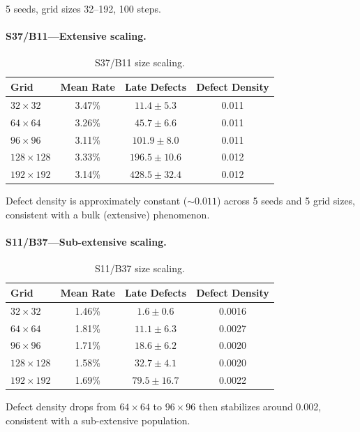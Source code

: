 \documentclass[11pt]{article}
\theoremstyle{definition}
\theoremstyle{remark}
\begin{document}
5 seeds, grid sizes 32--192, 100 steps.

\paragraph{S37/B11---Extensive scaling.}

\begin{table}[h]
\centering
\caption{S37/B11 size scaling.}
\begin{tabular}{lccc}
\toprule
Grid & Mean Rate & Late Defects & Defect Density \\
\midrule
$32 \times 32$   & 3.47\% & $11.4 \pm 5.3$  & 0.011 \\
$64 \times 64$   & 3.26\% & $45.7 \pm 6.6$  & 0.011 \\
$96 \times 96$   & 3.11\% & $101.9 \pm 8.0$ & 0.011 \\
$128 \times 128$ & 3.33\% & $196.5 \pm 10.6$ & 0.012 \\
$192 \times 192$ & 3.14\% & $428.5 \pm 32.4$ & 0.012 \\
\bottomrule
\end{tabular}
\end{table}

Defect density is approximately constant (${\sim}0.011$) across 5 seeds and 5 grid sizes, consistent with a bulk (extensive) phenomenon.

\paragraph{S11/B37---Sub-extensive scaling.}

\begin{table}[h]
\centering
\caption{S11/B37 size scaling.}
\begin{tabular}{lccc}
\toprule
Grid & Mean Rate & Late Defects & Defect Density \\
\midrule
$32 \times 32$   & 1.46\% & $1.6 \pm 0.6$   & 0.0016 \\
$64 \times 64$   & 1.81\% & $11.1 \pm 6.3$  & 0.0027 \\
$96 \times 96$   & 1.71\% & $18.6 \pm 6.2$  & 0.0020 \\
$128 \times 128$ & 1.58\% & $32.7 \pm 4.1$  & 0.0020 \\
$192 \times 192$ & 1.69\% & $79.5 \pm 16.7$ & 0.0022 \\
\bottomrule
\end{tabular}
\end{table}

Defect density drops from $64 \times 64$ to $96 \times 96$ then stabilizes around 0.002, consistent with a sub-extensive population.
\end{document}
